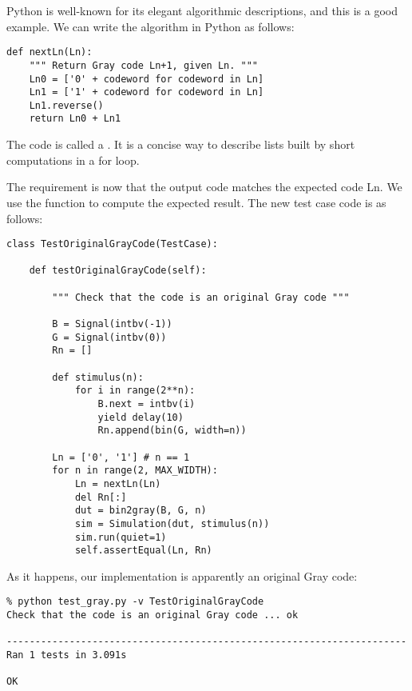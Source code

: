 Python is well-known  for its elegant algorithmic
descriptions, and this is a good example. We can write the algorithm
in Python as follows:

\begin{verbatim}
def nextLn(Ln):
    """ Return Gray code Ln+1, given Ln. """
    Ln0 = ['0' + codeword for codeword in Ln]
    Ln1 = ['1' + codeword for codeword in Ln]
    Ln1.reverse()
    return Ln0 + Ln1

\end{verbatim}

The code  is called a . It is a concise way to describe lists built by short
computations in a for loop.

The requirement is now that the output code matches the
expected code Ln. We use the  function to compute the
expected result. The new test case code is as follows:

\begin{verbatim}
class TestOriginalGrayCode(TestCase):

    def testOriginalGrayCode(self):
        
        """ Check that the code is an original Gray code """

        B = Signal(intbv(-1))
        G = Signal(intbv(0))
        Rn = []
        
        def stimulus(n):
            for i in range(2**n):
                B.next = intbv(i)
                yield delay(10)
                Rn.append(bin(G, width=n))
        
        Ln = ['0', '1'] # n == 1
        for n in range(2, MAX_WIDTH):
            Ln = nextLn(Ln)
            del Rn[:]
            dut = bin2gray(B, G, n)
            sim = Simulation(dut, stimulus(n))
            sim.run(quiet=1)
            self.assertEqual(Ln, Rn)

\end{verbatim}

As it happens, our implementation is apparently an original Gray code:

\begin{verbatim}
% python test_gray.py -v TestOriginalGrayCode
Check that the code is an original Gray code ... ok

----------------------------------------------------------------------
Ran 1 tests in 3.091s

OK
\end{verbatim}


 

